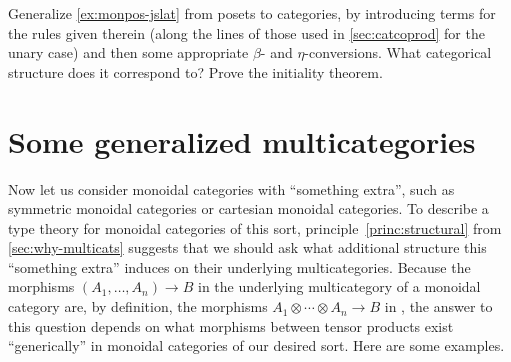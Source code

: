 \documentclass{book}
\let\tensor\otimes
\begin{document}
\begin{ex}\label{ex:moncat-coprod}
  Generalize \cref{ex:monpos-jslat} from posets to categories, by introducing terms for the rules given therein (along the lines of those used in \cref{sec:catcoprod} for the unary case) and then some appropriate $\beta$- and $\eta$-conversions.
  What categorical structure does it correspond to?
  Prove the initiality theorem.
\end{ex}


\section{Some generalized multicategories}
\label{sec:cartmulti}

Now let us consider monoidal categories with ``something extra'', such as symmetric monoidal categories or cartesian monoidal categories.
To describe a type theory for monoidal categories of this sort, principle~\eqref{princ:structural} from \cref{sec:why-multicats} suggests that we should ask what additional structure this ``something extra'' induces on their underlying multicategories.
Because the morphisms $(A_1,\dots,A_n) \to B$ in the underlying multicategory of a monoidal category \cC are, by definition, the morphisms $A_1\tensor\cdots\tensor A_n \to B$ in \cC, the answer to this question depends on what morphisms between tensor products exist ``generically'' in monoidal categories of our desired sort.
Here are some examples.
\end{document}
